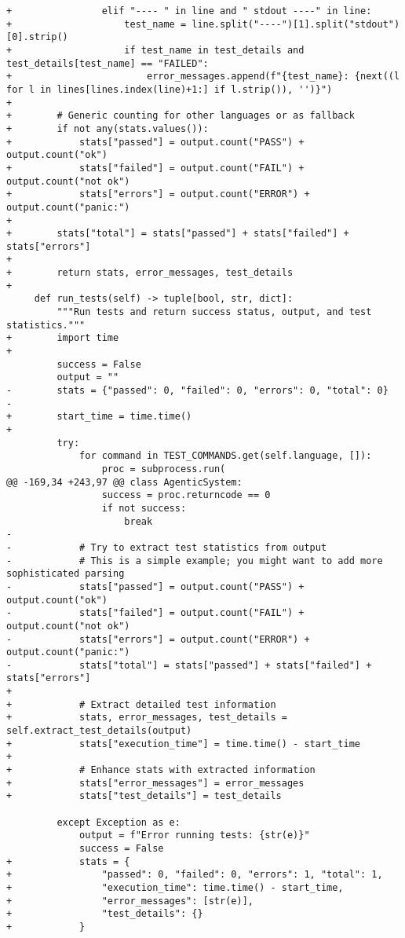 \begin{lstlisting}[style=diffstyle]
+                elif "---- " in line and " stdout ----" in line:
+                    test_name = line.split("----")[1].split("stdout")[0].strip()
+                    if test_name in test_details and test_details[test_name] == "FAILED":
+                        error_messages.append(f"{test_name}: {next((l for l in lines[lines.index(line)+1:] if l.strip()), '')}")
+
+        # Generic counting for other languages or as fallback
+        if not any(stats.values()):
+            stats["passed"] = output.count("PASS") + output.count("ok")
+            stats["failed"] = output.count("FAIL") + output.count("not ok")
+            stats["errors"] = output.count("ERROR") + output.count("panic:")
+            
+        stats["total"] = stats["passed"] + stats["failed"] + stats["errors"]
+        
+        return stats, error_messages, test_details
+
     def run_tests(self) -> tuple[bool, str, dict]:
         """Run tests and return success status, output, and test statistics."""
+        import time
+        
         success = False
         output = ""
-        stats = {"passed": 0, "failed": 0, "errors": 0, "total": 0}
-
+        start_time = time.time()
+        
         try:
             for command in TEST_COMMANDS.get(self.language, []):
                 proc = subprocess.run(
@@ -169,34 +243,97 @@ class AgenticSystem:
                 success = proc.returncode == 0
                 if not success:
                     break
-
-            # Try to extract test statistics from output
-            # This is a simple example; you might want to add more sophisticated parsing
-            stats["passed"] = output.count("PASS") + output.count("ok")
-            stats["failed"] = output.count("FAIL") + output.count("not ok")
-            stats["errors"] = output.count("ERROR") + output.count("panic:")
-            stats["total"] = stats["passed"] + stats["failed"] + stats["errors"]
+            
+            # Extract detailed test information
+            stats, error_messages, test_details = self.extract_test_details(output)
+            stats["execution_time"] = time.time() - start_time
+            
+            # Enhance stats with extracted information
+            stats["error_messages"] = error_messages
+            stats["test_details"] = test_details
             
         except Exception as e:
             output = f"Error running tests: {str(e)}"
             success = False
+            stats = {
+                "passed": 0, "failed": 0, "errors": 1, "total": 1,
+                "execution_time": time.time() - start_time,
+                "error_messages": [str(e)],
+                "test_details": {}
+            }
 

\end{lstlisting}

